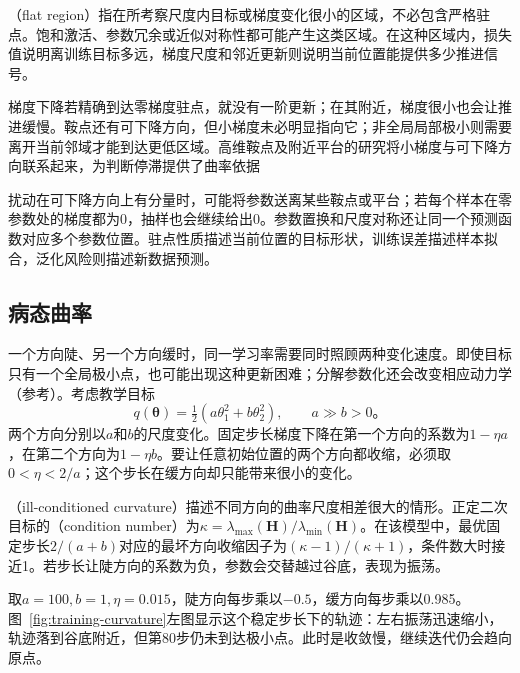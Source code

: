 （flat region）指在所考察尺度内目标或梯度变化很小的区域，不必包含严格驻点。饱和激活、参数冗余或近似对称性都可能产生这类区域。在这种区域内，损失值说明离训练目标多远，梯度尺度和邻近更新则说明当前位置能提供多少推进信号。

梯度下降若精确到达零梯度驻点，就没有一阶更新；在其附近，梯度很小也会让推进缓慢。鞍点还有可下降方向，但小梯度未必明显指向它；非全局局部极小则需要离开当前邻域才能到达更低区域。高维鞍点及附近平台的研究将小梯度与可下降方向联系起来，为判断停滞提供了曲率依据

扰动在可下降方向上有分量时，可能将参数送离某些鞍点或平台；若每个样本在零参数处的梯度都为0，抽样也会继续给出0。参数置换和尺度对称还让同一个预测函数对应多个参数位置。驻点性质描述当前位置的目标形状，训练误差描述样本拟合，泛化风险则描述新数据预测。

\subsection{病态曲率}
\label{sec:training-curvature}

一个方向陡、另一个方向缓时，同一学习率需要同时照顾两种变化速度。即使目标只有一个全局极小点，也可能出现这种更新困难；分解参数化还会改变相应动力学（参考）。考虑教学目标
\begin{equation}
  q(\bm\theta)=\tfrac12(a\theta_1^2+b\theta_2^2),
  \qquad a\gg b>0\text{。}
  \label{eq:training-quadratic}
\end{equation}
两个方向分别以$a$和$b$的尺度变化。固定步长梯度下降在第一个方向的系数为$1-\eta a$，在第二个方向为$1-\eta b$。要让任意初始位置的两个方向都收缩，必须取$0<\eta<2/a$；这个步长在缓方向却只能带来很小的变化。

（ill-conditioned curvature）描述不同方向的曲率尺度相差很大的情形。正定二次目标的（condition number）为$\kappa=\lambda_{\max}(\bm H)/\lambda_{\min}(\bm H)$。在该模型中，最优固定步长$2/(a+b)$对应的最坏方向收缩因子为$(\kappa-1)/(\kappa+1)$，条件数大时接近1。若步长让陡方向的系数为负，参数会交替越过谷底，表现为振荡。

取$a=100,b=1,\eta=0.015$，陡方向每步乘以$-0.5$，缓方向每步乘以0.985。图~\ref{fig:training-curvature}左图显示这个稳定步长下的轨迹：左右振荡迅速缩小，轨迹落到谷底附近，但第80步仍未到达极小点。此时是收敛慢，继续迭代仍会趋向原点。

